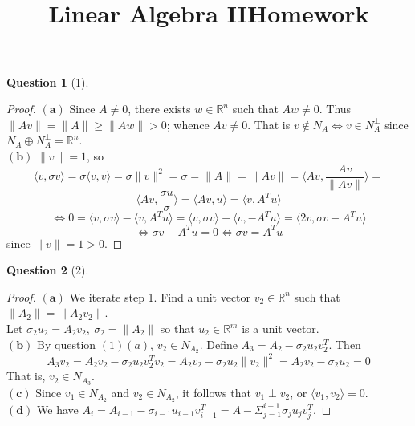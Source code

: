 \documentclass[11pt]{article}
\title{\vspace{-50pt}
\Huge \name
\\\vspace{20pt}
\huge Linear Algebra II\hfill Homework \hw}
\author{}
\date{}
\theoremstyle{quest}
\newtheorem*{question}{Question}
\begin{document}
\maketitle

\begin{question}[1]
\end{question}
\begin{proof}
$\mathbf{(a)}$ Since $A \ne 0$, there exists $w \in \mathbb{R}^{n}$ such that $Aw \ne 0$. Thus
\\$\|Av\| = \|A\| \ge \|Aw\| > 0$; whence $Av \ne 0$. That is $v \not\in N_A \iff v \in N_A^{\perp}$ since $N_A \oplus N_A^{\perp} = \mathbb{R}^n$.
\\$\mathbf{(b)}$ $\|v\| = 1$, so
$$\langle v, \sigma v \rangle = \sigma \langle v, v \rangle = \sigma \|v\|^2 = \sigma = \|A\| = \|Av\| = \langle Av, \frac{Av}{\|Av\|} \rangle = $$ $$\langle Av, \frac{\sigma u}{\sigma} \rangle = \langle Av, u \rangle = \langle v, A^T u \rangle$$
$$\iff 0= \langle v, \sigma v \rangle - \langle v, A^T u \rangle = \langle v, \sigma v \rangle + \langle v, -A^T u \rangle = \langle 2v, 
\sigma v - A^T u \rangle$$
$$\iff \sigma v - A^T u = 0 \iff \sigma v = A^T u$$
since $\|v\| = 1 > 0$.
\end{proof}

\begin{question}[2]
\end{question}
\begin{proof}
$\mathbf{(a)}$ We iterate step 1. Find a unit vector $v_2 \in \mathbb{R}^n$ such that $\|A_2\| = \|A_2v_2\|$.
\\Let $\sigma_2 u_2 = A_2 v_2,\ \sigma_2 = \|A_2\|$ so that $u_2 \in \mathbb{R}^m$ is a unit vector.
\\$\mathbf{(b)}$ By question $(1)(a)$, $v_2 \in N_{A_2}^{\perp}$. Define $A_3 = A_2 - \sigma_2 u_2 v_2^T$. Then
$$A_3 v_2 = A_2 v_2 - \sigma_2 u_2 v_2^Tv_2 = A_2 v_2 - \sigma_2 u_2 \|v_2\|^2 = A_2 v_2 - \sigma_2 u_2 = 0$$
That is, $v_2 \in N_{A_3}$.
\\$\mathbf{(c)}$ Since $v_1 \in N_{A_2}$ and $v_2 \in N_{A_2}^{\perp}$, it follows that $v_1 \perp v_2$, or $\langle v_1, v_2 \rangle = 0$.
\\$\mathbf{(d)}$ We have $A_i = A_{i-1} - \sigma_{i-1} u_{i-1} v_{i-1}^T = A - \Sigma_{j=1}^{i-1} \sigma_j u_j v_j^T$.
\end{proof}
\end{document}
